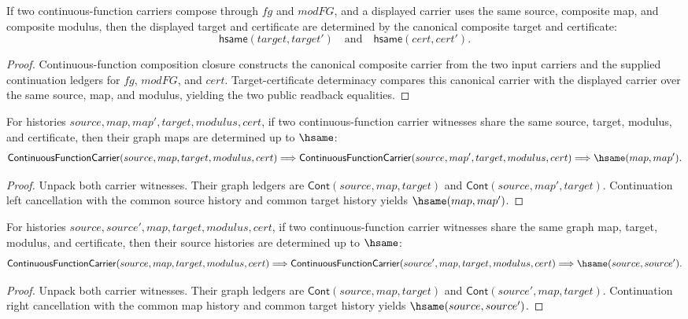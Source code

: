 \begin{theorem}
\label{thm:continuous-function-carrier-comp-public-readback}
If two continuous-function carriers compose through $fg$ and $modFG$, and a
displayed carrier uses the same source, composite map, and composite modulus,
then the displayed target and certificate are determined by the canonical
composite target and certificate:
$$
\mathsf{hsame}(target,target')\quad\text{and}\quad
\mathsf{hsame}(cert,cert').
$$
\end{theorem}
\begin{proof}
Continuous-function composition closure constructs the canonical composite
carrier from the two input carriers and the supplied continuation ledgers for
$fg$, $modFG$, and $cert$. Target-certificate determinacy compares this
canonical carrier with the displayed carrier over the same source, map, and
modulus, yielding the two public readback equalities.
\end{proof}

\begin{theorem}
\label{thm:continuous-function-carrier-map-deterministic}
For histories $source,map,map',target,modulus,cert$, if two
continuous-function carrier witnesses share the same source, target, modulus,
and certificate, then their graph maps are determined up to $\hsame$:
$$
\mathsf{ContinuousFunctionCarrier}(source,map,target,modulus,cert)
\Longrightarrow
\mathsf{ContinuousFunctionCarrier}(source,map',target,modulus,cert)
\Longrightarrow
\hsame(map,map').
$$
\end{theorem}
\begin{proof}
Unpack both carrier witnesses. Their graph ledgers are
$\mathsf{Cont}(source,map,target)$ and
$\mathsf{Cont}(source,map',target)$. Continuation left cancellation with the
common source history and common target history yields $\hsame(map,map')$.
\end{proof}

\begin{theorem}
\label{thm:continuous-function-carrier-source-deterministic}
For histories $source,source',map,target,modulus,cert$, if two
continuous-function carrier witnesses share the same graph map, target,
modulus, and certificate, then their source histories are determined up to
$\hsame$:
$$
\mathsf{ContinuousFunctionCarrier}(source,map,target,modulus,cert)
\Longrightarrow
\mathsf{ContinuousFunctionCarrier}(source',map,target,modulus,cert)
\Longrightarrow
\hsame(source,source').
$$
\end{theorem}
\begin{proof}
Unpack both carrier witnesses. Their graph ledgers are
$\mathsf{Cont}(source,map,target)$ and
$\mathsf{Cont}(source',map,target)$. Continuation right cancellation with the
common map history and common target history yields $\hsame(source,source')$.
\end{proof}

